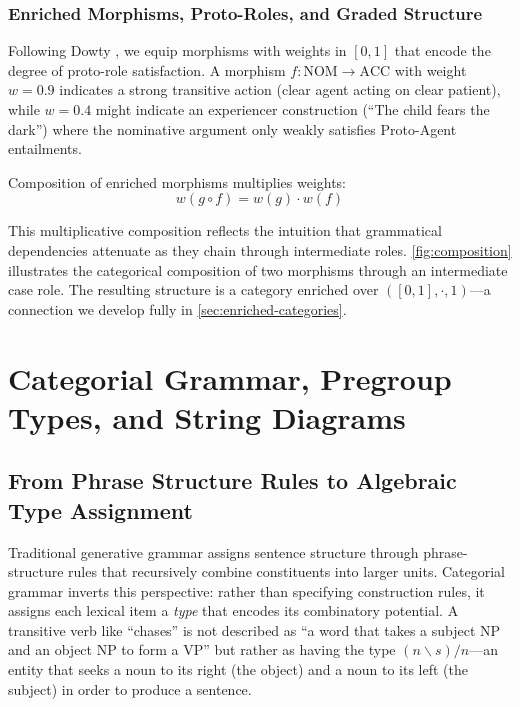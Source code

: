 \documentclass[
]{article}
\numberwithin{equation}{section}
\begin{document}
\subsubsection{Enriched Morphisms, Proto-Roles, and Graded
Structure}\label{enriched-morphisms-proto-roles-and-graded-structure}

Following Dowty \citeyearpar{dowty1991thematic}, we equip morphisms with
weights in \([0,1]\) that encode the degree of proto-role satisfaction.
A morphism \(f: \text{NOM} \to \text{ACC}\) with weight \(w = 0.9\)
indicates a strong transitive action (clear agent acting on clear
patient), while \(w = 0.4\) might indicate an experiencer construction
(``The child fears the dark'') where the nominative argument only weakly
satisfies Proto-Agent entailments.

Composition of enriched morphisms multiplies weights:
\[w(g \circ f) = w(g) \cdot w(f) \tag{2.1}\]

This multiplicative composition reflects the intuition that grammatical
dependencies attenuate as they chain through intermediate roles.
\autoref{fig:composition} illustrates the categorical composition of two
morphisms through an intermediate case role. The resulting structure is
a category enriched over \(([0,1], \cdot, 1)\)---a connection we develop
fully in \autoref{sec:enriched-categories}.

\newpage

\section{Categorial Grammar, Pregroup Types, and String
Diagrams}\label{sec:categorial-grammar}

\subsection{From Phrase Structure Rules to Algebraic Type
Assignment}\label{from-phrase-structure-rules-to-algebraic-type-assignment}

Traditional generative grammar assigns sentence structure through
phrase-structure rules that recursively combine constituents into larger
units. Categorial grammar inverts this perspective: rather than
specifying construction rules, it assigns each lexical item a
\emph{type} that encodes its combinatory potential. A transitive verb
like ``chases'' is not described as ``a word that takes a subject NP and
an object NP to form a VP'' but rather as having the type
\((n \backslash s) / n\)---an entity that seeks a noun to its right (the
object) and a noun to its left (the subject) in order to produce a
sentence.
\end{document}
